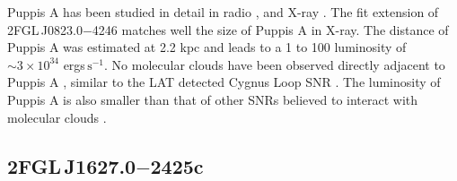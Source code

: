 \documentclass[12pt,preprint]{aastex}
\newcommand{\gev}{\text{GeV}\xspace}
\newcommand{\s}{\text{s}\xspace}
\begin{document}
Puppis A has been studied in detail in radio \citep{puppis_a_vla}, 
and  X-ray \citep{rosat_puppis_a,suzaku_puppis_a}.
The fit extension of 2FGL\,J0823.0$-$4246
matches well the size of Puppis A in X-ray.  The distance of Puppis A was
estimated at 2.2 kpc \citep{reynoso_1995,reynoso_2003} and leads to a 1
\gev to 100 \gev luminosity of $\sim 3\times 10^{34}$ ergs$\,\s^{-1}$.
No molecular clouds have been observed directly adjacent to Puppis A
\citep{co_eastern_puppis_a}, similar to the LAT detected Cygnus Loop SNR
\citep{cygnus_loop_lat}.  The luminosity of Puppis A is also smaller
than that of other SNRs believed to interact with molecular clouds
\citep{w51c,ic443,w44,w28,w49b_lat}.


%
    
\subsection{2FGL\,J1627.0$-$2425c}
\label{section_2FGL_J1627.0-2425c}
\end{document}
